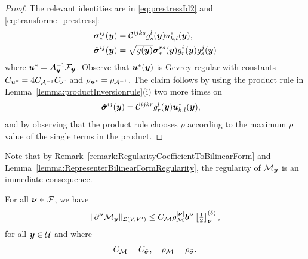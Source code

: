 \begin{proof}
The relevant identities are in \eqref{eq:prestressId2} and \eqref{eq:transforme_prestress}:
\begin{align*}
        \boldsymbol{\sigma}_*^{ij}({\boldsymbol{y}}) &= \mathcal{C}^{ijks}g_s^l({\boldsymbol{y}}) u^*_{k,l}({\boldsymbol{y}}), \\
        \tilde {\boldsymbol{\sigma}}^{ij}({\boldsymbol{y}}) &= \sqrt{g({\boldsymbol{y}})} \boldsymbol{\sigma}_*^{rs}({\boldsymbol{y}}) g_{r}^i({\boldsymbol{y}})  g_{s}^j({\boldsymbol{y}}) 
\end{align*}
where ${\boldsymbol{u}}^* = \mathcal{A}_{{\boldsymbol{y}}}^{-1}\mathcal{F}_{\boldsymbol{y}}$.
Observe that ${\boldsymbol{u}}^*({\boldsymbol{y}})$ is Gevrey-regular with constants $C_{{\boldsymbol{u}}^*} = 4 C_{\mathcal{A}^{-1}} C_{\mathcal{F}}$ and $\rho_{{\boldsymbol{u}}^*} = \rho_{\mathcal{A}^{-1}}$.
The claim follows by using the product rule in Lemma~\ref{lemma:productInversionrule}(i) two more times on
\begin{align*}
    \tilde {\boldsymbol{\sigma}}^{ij}({\boldsymbol{y}}) &=  \tilde {\mathcal{C}}^{ijkr} g_{r}^l({\boldsymbol{y}}) {\boldsymbol{u}}^*_{k,l}({\boldsymbol{y}}),
\end{align*}
and by observing that the product rule chooses $\rho$ according to the maximum $\rho$ value of the single terms in the product.
\end{proof}
Note that by Remark~\ref{remark:RegularityCoefficientToBilinearForm} and Lemma~\ref{lemma:RepresenterBilinearFormRegularity}, the regularity of $\mathcal{M}_{{\boldsymbol{y}}}$ is an immediate consequence.
\begin{theorem}\label{theorem:GevreyRegMy}
     For all ${\boldsymbol{\nu}} \in \mathcal{F}$, we have 
    \begin{align*}
        \| \partial^{\boldsymbol{\nu}} \mathcal{M}_{\boldsymbol{y}} \|_{\mathcal{L}(V,V')}  \leq C_{\mathcal{M}} \rho_{\mathcal{M}}^{\vert {\boldsymbol{\nu}} \vert} {\boldsymbol{b}}^{{\boldsymbol{\nu}}} \left[\tfrac{1}{2} \right]^{(\delta)}_{{\boldsymbol{\nu}}},
    \end{align*}
    for all ${\boldsymbol{y}} \in \mathcal{U}$ and where
    \begin{align}\label{eq:constantsMyReg}
       C_{\mathcal{M}} = C_{\tilde {\boldsymbol{\sigma}}} ,\quad\rho_{\mathcal{M}} = \rho_{\tilde  {\boldsymbol{\sigma}}}.
    \end{align}
\end{theorem}
    



